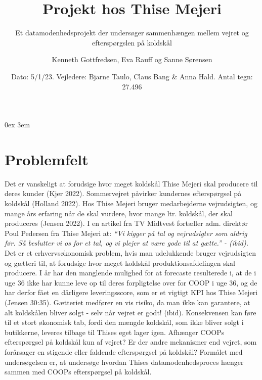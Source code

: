 \documentclass[
  12pt,
  a4paper,
  DIV=11,
  numbers=noendperiod]{scrartcl}
\title{Projekt hos Thise Mejeri}
\subtitle{Et datamodenhedsprojekt der undersøger sammenhængen mellem
vejret og efterspørgslen på koldskål}
\author{Kenneth Gottfredsen, Eva Rauff og Sanne Sørensen}
\date{Dato: 5/1/23. Vejledere: Bjarne Taulo, Claus Bang \& Anna Hald.
Antal tegn: 27.496}
\renewcommand*\contentsname{Table of contents}
\newcommand\contentsname{Table of contents}
\begin{document}
\maketitle
\ifdefined\Shaded\renewenvironment{Shaded}{\begin{tcolorbox}[boxrule=0pt, sharp corners, borderline west={3pt}{0pt}{shadecolor}, enhanced, interior hidden, frame hidden, breakable]}{\end{tcolorbox}}\fi

\renewcommand*\contentsname{Indholdsfortegnelse}
{
\hypersetup{linkcolor=}
\setcounter{tocdepth}{3}
\tableofcontents
}
\setcounter{page}{1} 
\parindent 0ex
\emergencystretch 3em
\pagestyle{fancy}
\fancyhead{}
\fancyfoot{}
\fancyfoot[C]{\thepage}
\renewcommand{\headrulewidth}{0.5pt}
\renewcommand{\footrulewidth}{0.5pt}

\hypertarget{problemfelt}{%
\section{Problemfelt}\label{problemfelt}}

Det er vanskeligt at forudsige hvor meget koldskål Thise Mejeri skal
producere til deres kunder (Kjer 2022). Sommervejret påvirker kundernes
efterspørgsel på koldskål (Holland 2022). Hos Thise Mejeri bruger
medarbejderne vejrudsigten, og mange års erfaring når de skal vurdere,
hvor mange ltr. koldskål, der skal produceres (Jensen 2022). I en
artikel fra TV Midtvest fortæller adm. direktør Poul Pedersen fra Thise
Mejeri at: \emph{``Vi kigger på tal og vejrudsigter som aldrig før. Så
beslutter vi os for et tal, og vi plejer at være gode til at gætte.'' -
(ibid).} Det er et erhvervsøkonomisk problem, hvis man udelukkende
bruger vejrudsigten og gætteri til, at forudsige hvor meget koldskål
produktionsafdelingen skal producere. I år har den manglende mulighed
for at forecaste resulterede i, at de i uge 36 ikke har kunne leve op
til deres forpligtelse over for COOP i uge 36, og de har derfor fået en
dårligere leveringsscore, som er et vigtigt KPI hos Thise Mejeri (Jensen
30:35). Gætteriet medfører en vis risiko, da man ikke kan garantere, at
alt koldskålen bliver solgt - selv når vejret er godt! (ibid).
Konsekvensen kan føre til et stort økonomisk tab, fordi den mængde
koldskål, som ikke bliver solgt i butikkerne, leveres tilbage til Thises
eget lager igen. Afhænger COOPs efterspørgsel på koldskål kun af vejret?
Er der andre mekanismer end vejret, som forårsager en stigende eller
faldende efterspørgsel på koldskål? Formålet med undersøgelsen er, at
undersøge hvordan Thises datamodenhedsproces hænger sammen med COOPs
efterspørgsel på koldskål.
\end{document}

